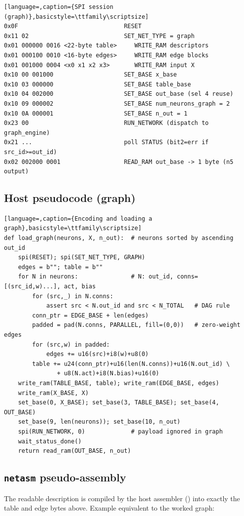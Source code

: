 \begin{lstlisting}[language=,caption={SPI session (graph)},basicstyle=\ttfamily\scriptsize]
0x0F                              RESET
0x11 02                           SET_NET_TYPE = graph
0x01 000000 0016 <22-byte table>     WRITE_RAM descriptors
0x01 000100 0010 <16-byte edges>     WRITE_RAM edge blocks
0x01 001000 0004 <x0 x1 x2 x3>       WRITE_RAM input X
0x10 00 001000                    SET_BASE x_base
0x10 03 000000                    SET_BASE table_base
0x10 04 002000                    SET_BASE out_base (sel 4 reuse)
0x10 09 000002                    SET_BASE num_neurons_graph = 2
0x10 0A 000001                    SET_BASE n_out = 1
0x23 00                           RUN_NETWORK (dispatch to graph_engine)
0x21 ...                          poll STATUS (bit2=err if src_id>=out_id)
0x02 002000 0001                  READ_RAM out_base -> 1 byte (n5 output)
\end{lstlisting}

\subsection{Host pseudocode (graph)}
\begin{lstlisting}[language=,caption={Encoding and loading a graph},basicstyle=\ttfamily\scriptsize]
def load_graph(neurons, X, n_out):  # neurons sorted by ascending out_id
    spi(RESET); spi(SET_NET_TYPE, GRAPH)
    edges = b""; table = b""
    for N in neurons:               # N: out_id, conns=[(src_id,w)...], act, bias
        for (src,_) in N.conns:
            assert src < N.out_id and src < N_TOTAL   # DAG rule
        conn_ptr = EDGE_BASE + len(edges)
        padded = pad(N.conns, PARALLEL, fill=(0,0))   # zero-weight edges
        for (src,w) in padded:
            edges += u16(src)+i8(w)+u8(0)
        table += u24(conn_ptr)+u16(len(N.conns))+u16(N.out_id) \
               + u8(N.act)+i8(N.bias)+u16(0)
    write_ram(TABLE_BASE, table); write_ram(EDGE_BASE, edges)
    write_ram(X_BASE, X)
    set_base(0, X_BASE); set_base(3, TABLE_BASE); set_base(4, OUT_BASE)
    set_base(9, len(neurons)); set_base(10, n_out)
    spi(RUN_NETWORK, 0)             # payload ignored in graph
    wait_status_done()
    return read_ram(OUT_BASE, n_out)
\end{lstlisting}

\subsection{\texttt{netasm} pseudo-assembly}
The readable description is compiled by the host assembler () into
exactly the table and edge bytes above. Example equivalent to the worked graph:

